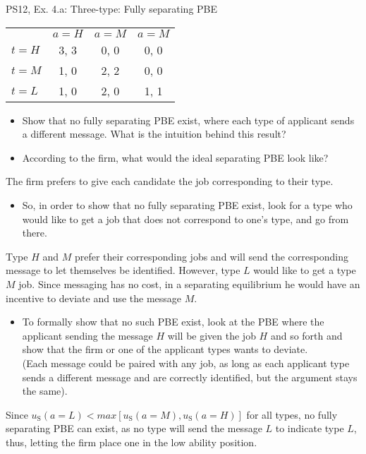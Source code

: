 \begin{frame}{PS12, Ex. 4.a: Three-type: Fully separating PBE}
    \begin{table}
      \begin{tabular}{l|c|c|c|}
          \multicolumn{1}{c}{} & \multicolumn{1}{c}{$a=H$} & \multicolumn{1}{c}{$a=M$} & \multicolumn{1}{c}{$a=M$} \\\cline{2-4}
          $t=H$ & 3, 3 & 0, 0 & 0, 0 \\\cline{2-4}
          $t=M$ & 1, 0 & 2, 2 & 0, 0 \\\cline{2-4}
          $t=L$ & 1, 0 & 2, 0 & 1, 1 \\\cline{2-4}
      \end{tabular}
    \end{table}\vspace{-8pt}
    \begin{itemize}
      \item[(a)] Show that no fully separating PBE exist, where each type of applicant sends a different message. What is the intuition behind this result?
      \item[Step 1:] According to the firm, what would the ideal separating PBE look like?
    \end{itemize}\vspace{-6pt}
    The firm prefers to give each candidate the job corresponding to their type.\vspace{-4pt}
    \begin{itemize}
      \item[Step 2:] So, in order to show that no fully separating PBE exist, look for a type who would like to get a job that does not correspond to one's type, and go from there.
    \end{itemize}\vspace{-6pt}
    Type $H$ and $M$ prefer their corresponding jobs and will send the corresponding message to let themselves be identified. However, type $L$ would like to get a type $M$ job. Since messaging has no cost, in a separating equilibrium he would have an incentive to deviate and use the message $M$.\vspace{-4pt}
    \begin{itemize}
      \item[Step 3:] To formally show that no such PBE exist, look at the PBE where the applicant sending the message $H$ will be given the job $H$ and so forth and show that the firm or one of the applicant types wants to deviate.\\
      (Each message could be paired with any job, as long as each applicant type sends a different message and are correctly identified, but the argument stays the same).
    \end{itemize}\vspace{-6pt}
    Since $u_\text{S}(a=L)<max[u_\text{S}(a=M),u_\text{S}(a=H)]$ for all types, no fully separating PBE can exist, as no type will send the message $L$ to indicate type $L$, thus, letting the firm place one in the low ability position.
    \vfill\null
\end{frame}


